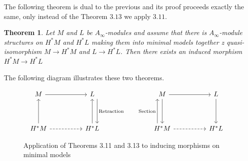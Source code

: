 \documentclass[a4paper, 12pt, openany, fleqn]{amsart}
\newtheorem{theorem}{Theorem}[section]
\begin{document}
The following theorem is dual to the previous and its proof proceeds exactly the same, only instead of the Theorem $3.13$ we apply $3.11$.

\begin{theorem}
    Let $M$ and $L$ be $A_\infty$-modules and assume that there is  $A_\infty$-module structures on $H^*M$ and $H^*L$ making them into minimal models together z quasi-isomorphism $M\longrightarrow H^*M$ and $L \longrightarrow H^*L$. Then there exists an induced morphism $H^*M\longrightarrow H^*L$
\end{theorem}

The following diagram illustrates these two theorems.

\begin{figure}[H]
\[\begin{tikzcd}
	M && L &&& M && L \\
	\\
	{H^*M} && {H^*L} &&& {H^*M} && {H^*L}
	\arrow[from=1-1, to=1-3]
	\arrow["\text{Retraction}", shift left=3, from=1-3, to=3-3]
	\arrow[from=1-6, to=1-8]
	\arrow[from=1-6, to=3-6]
	\arrow[from=1-8, to=3-8]
	\arrow[from=3-1, to=1-1]
	\arrow[dashed, from=3-1, to=3-3]
	\arrow[from=3-3, to=1-3]
	\arrow["{\text{Section}}", shift left=3, from=3-6, to=1-6]
	\arrow[dashed, from=3-6, to=3-8]
\end{tikzcd}\]
    \caption{Application of Theorems 3.11 and 3.13 to inducing morphisms on minimal models}
    \label{fig:1}
\end{figure}


\end{document}
